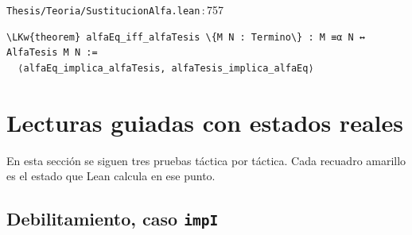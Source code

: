 \documentclass[11pt,a4paper]{article}
\newcommand{\LKw}[1]{\textcolor{kw}{\bfseries #1}}
\newcommand{\ruta}[2]{\texttt{#1}\,:\,#2}
\begin{document}
\begin{codigolean}{\ruta{Thesis/Teoria/SustitucionAlfa.lean}{757}}
\begin{Verbatim}[commandchars=\\\{\}]
\LKw{theorem} alfaEq_iff_alfaTesis \{M N : Termino\} : M ≡α N ↔ AlfaTesis M N :=
  ⟨alfaEq_implica_alfaTesis, alfaTesis_implica_alfaEq⟩
\end{Verbatim}
\end{codigolean}

\section{Lecturas guiadas con estados reales}\label{sec:guiadas}

En esta sección se siguen tres pruebas táctica por táctica. Cada recuadro
amarillo es el estado que Lean calcula en ese punto.

\subsection{Debilitamiento, caso \texttt{impI}}\label{sec:guiada-debilitamiento}
\end{document}
